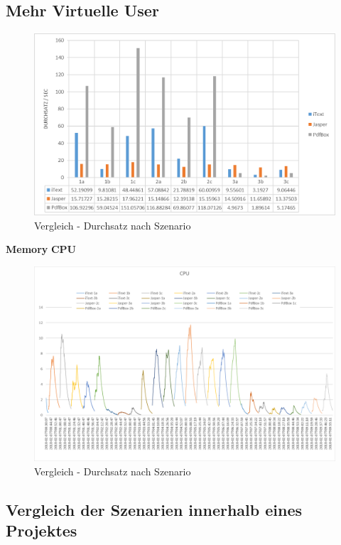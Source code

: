\documentclass[main.tex]{subfiles}
\begin{document}
\subsection{Mehr Virtuelle User}
\begin{figure}[h]
\includegraphics[width=\textwidth]{mainpart/4_analyse_img/VglDurchSzen.png}
 \caption{Vergleich - Durchsatz nach Szenario}
 \label{figure:througputSzenario}
\end{figure}


\textbf{Memory}
\textbf{CPU}
\begin{figure}[h]
\includegraphics[width=\textwidth]{mainpart/4_analyse_img/CPUVergleich.png}
 \caption{Vergleich - Durchsatz nach Szenario}
 \label{figure:cpuVergleich}
\end{figure}

\subsection{Vergleich der Szenarien innerhalb eines Projektes}
\end{document}
